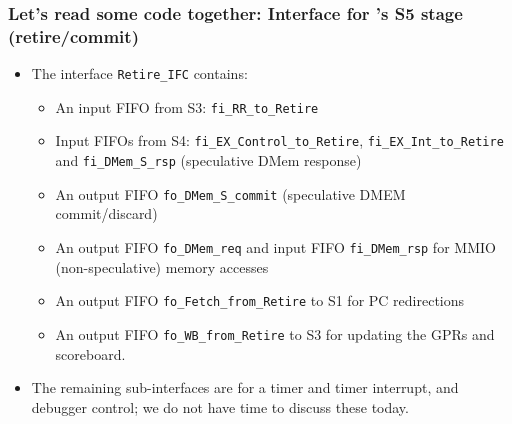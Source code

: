 \begin{frame}[fragile]
\frametitle{Let's read some code together: Interface for {\FIFE}'s S5 stage (retire/commit)}

\begin{center}\scriptsize

 \vspace*{5ex}
 
 \begin{minipage}{0.9\textwidth}
  \begin{itemize}

   \item The interface {\tt Retire\_IFC} contains:
     \begin{itemize}\scriptsize
       \item An input FIFO from S3: {\tt fi\_RR\_to\_Retire}
       \item Input FIFOs from S4: {\tt fi\_EX\_Control\_to\_Retire},
             {\tt fi\_EX\_Int\_to\_Retire} and
	     {\tt fi\_DMem\_S\_rsp} (speculative DMem response)
       \item An output FIFO {\tt fo\_DMem\_S\_commit} (speculative DMEM commit/discard)
       \item An output FIFO {\tt fo\_DMem\_req} and input FIFO {\tt fi\_DMem\_rsp}
           for MMIO (non-speculative) memory accesses
       \item An output FIFO {\tt fo\_Fetch\_from\_Retire} to S1 for PC redirections

       \item An output FIFO {\tt fo\_WB\_from\_Retire} to S3 for
             updating the GPRs and scoreboard.
     \end{itemize}

   \vspace*{5ex}

   \item The remaining sub-interfaces are for a timer and timer interrupt,
     and debugger control; we do not have time to discuss these today.

  \end{itemize}
 \end{minipage}
\end{center}

\end{frame}


